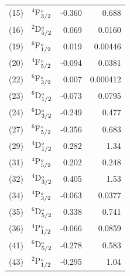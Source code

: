 \documentclass[10pt,a4paper, twoside]{report}
\begin{document}
\begin{table}[t!]
\begin{tabular}{cl@{\hspace{0.75cm}}r@{\hspace{0.75cm}}r@{\hspace{0.75cm}}}
 (15) &$^4$F$^{\rm_o}_{3/2}$  & -0.360   & 0.688   \\
 (16) &$^2$D$^{\rm_o}_{5/2}$    & 0.069   & 0.0160   \\
 (19) &$^6$F$^{\rm_o}_{1/2}$   &   0.019   & 0.00446  \\
 (20) &$^4$F$^{\rm_o}_{5/2}$   &  -0.094   & 0.0381  \\
 (22) &$^6$F$^{\rm_o}_{3/2}$  & 0.007   & 0.000412  \\
 (23) &$^6$D$^{\rm_o}_{1/2}$    & -0.073   & 0.0795 \\
 (24) &$^6$D$^{\rm_o}_{3/2}$ & -0.249   & 0.477 \\
 (27) &$^6$F$^{\rm_o}_{5/2}$   & -0.356   & 0.683   \\
 (29) &$^4$D$^{\rm_o}_{1/2}$   &  0.282   & 1.34 \\
 (31) &$^4$P$^{\rm_o}_{5/2}$ & 0.202   & 0.248 \\
 (32) &$^4$D$^{\rm_o}_{3/2}$   & 0.405   & 1.53    \\
 (34) &$^4$P$^{\rm_o}_{3/2}$   &  -0.063   & 0.0377 \\
 (35) &$^6$D$^{\rm_o}_{5/2}$  & 0.338   & 0.741   \\
 (36) &$^4$P$^{\rm_o}_{1/2}$    & -0.066   & 0.0859  \\
 (41) &$^6$D$^{\rm_o}_{5/2}$  & -0.278   & 0.583  \\
 (43) & $^2$P$^{\rm_o}_{1/2}$  &  -0.295   & 1.04  \\
\bottomrule
\bottomrule
\end{tabular}
\end{table}
\end{document}
